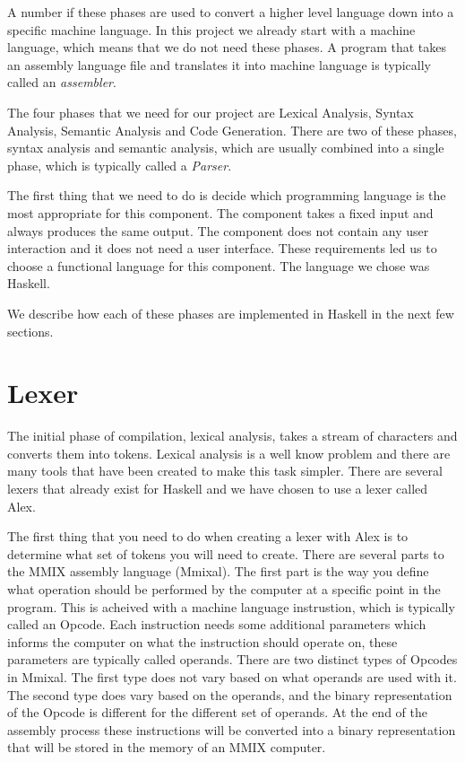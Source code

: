 \documentclass[a4paper,11pt]{report}
\begin{document}
A number if these phases are used to convert a higher level language down into a specific machine language.  In this project we already start with a machine language, which means that we do not need these phases. A program that takes an assembly language file and translates it into machine language is typically called an \textit{assembler}.

The four phases that we need for our project are Lexical Analysis, Syntax Analysis, Semantic Analysis and Code Generation. There are two of these phases, syntax analysis and semantic analysis, which are usually combined into a single phase, which is typically called a \textit{Parser}.

The first thing that we need to do is decide which programming language is the most appropriate for this component. The component takes a fixed input and always produces the same output. The component does not contain any user interaction and it does not need a user interface. These requirements led us to choose a functional language for this component. The language we chose was Haskell.

We describe how each of these phases are implemented in Haskell in the next few sections.
\section{Lexer}
The initial phase of compilation, lexical analysis, takes a stream of characters and converts them into tokens. Lexical analysis is a well know problem and there are many tools that have been created to make this task simpler. There are several lexers that already exist for Haskell and we have chosen to use a lexer called Alex\cite{alex}. 

The first thing that you need to do when creating a lexer with Alex is to determine what set of tokens you will need to create. There are several parts to the MMIX assembly language (Mmixal). The first part is the way you define what operation should be performed by the computer at a specific point in the program. This is acheived with a machine language instrustion, which is typically called an Opcode. Each instruction needs some additional parameters which informs the computer on what the instruction should operate on, these parameters are typically called operands. There are two distinct types of Opcodes in Mmixal. The first type does not vary based on what operands are used with it. The second type does vary based on the operands, and the binary representation of the Opcode is different for the different set of operands. At the end of the assembly process these instructions will be converted into a binary representation that will be stored in the memory of an MMIX computer.
\end{document}
